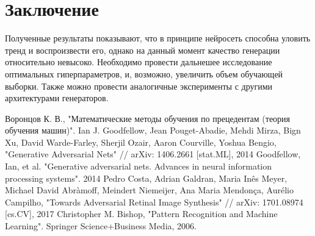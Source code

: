 \documentclass[a4paper]{article}
\begin{document}
	\section{Заключение}
		Полученные результаты показывают, что в принципе нейросеть способна уловить тренд и воспроизвести его, однако на данный момент качество генерации относительно невысоко. Необходимо провести дальнешее исследование оптимальных гиперпараметров, и, возможно, увеличить объем обучающей выборки. Также можно провести аналогичные эксперименты с другими архитектурами генераторов.
	\begin{thebibliography}{99}
		  Воронцов К. В., "Математические методы обучения по прецедентам (теория обучения машин)".
		 Ian J. Goodfellow, Jean Pouget-Abadie, Mehdi Mirza, Bign Xu, David Warde-Farley, Sherjil Ozair, Aaron Courville, Yoshua Bengio, "Generative Adversarial Nets" // arXiv: 1406.2661 [stat.ML], 2014
		 Goodfellow, Ian, et al. "Generative adversarial nets. Advances in neural information processing systems". 2014
		 Pedro Costa, Adrian Galdran, Maria Inês Meyer, Michael David Abràmoff, Meindert Niemeijer, Ana Maria Mendonça, Aurélio Campilho, "Towards Adversarial Retinal Image Synthesis" // arXiv: 1701.08974 [cs.CV], 2017
		 Christopher M. Bishop, "Pattern Recognition and Machine Learning". Springer Science+Business Media, 2006.
	\end{thebibliography}
\end{document}
